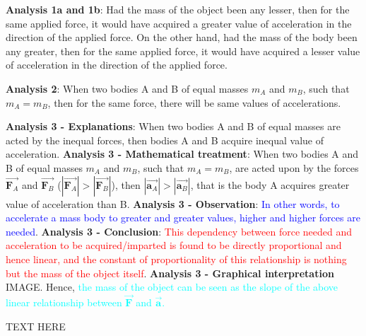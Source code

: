 \begin{flushright}
\begin{minipage}[h]{10.5cm}
\small{
\textbf{Analysis 1a and 1b}: Had the mass of the object been any lesser, then for the same applied force, it would have acquired a greater value of acceleration in the direction of the applied force. On the other hand, had the mass of the body been any greater, then for the same applied force, it would have acquired a lesser value of acceleration in the direction of the applied force.

\textbf{Analysis 2}: When two bodies A and B of equal masses $m_A$ and $m_B$, such that $m_A = m_B$, then for the same force, there will be same values of accelerations.

\textbf{Analysis 3 - Explanations}: When two bodies A and B of equal masses are acted by the inequal forces, then bodies A and B acquire inequal value of acceleration. \textbf{Analysis 3 - Mathematical treatment}: When two bodies A and B of equal masses $m_A$ and $m_B$, such that $m_A = m_B$, are acted upon by the forces $\vec{\mathbf{F}_A}$ and $\vec{\mathbf{F}_B}$ ($|\vec{\mathbf{F}_A}|>|\vec{\mathbf{F}_B}|$), then $|\vec{\mathbf{a}_A}|>|\vec{\mathbf{a}_B}|$, that is the body A acquires greater value of acceleration than B. \textbf{Analysis 3 - Observation}: \textcolor{blue}{In other words, to accelerate a mass body to greater and greater values, higher and higher forces are needed}. \textbf{Analysis 3 - Conclusion}: \textcolor{red}{This dependency between force needed and acceleration to be acquired/imparted is found to be directly proportional and hence linear, and the constant of proportionality of this relationship is nothing but the mass of the object itself}. \textbf{Analysis 3 - Graphical interpretation} IMAGE. Hence, \textcolor{cyan}{the mass of the object can be seen as the slope of the above linear relationship between $\vec{\mathbf{F}}$ and $\vec{\mathbf{a}}$.}
}
\end{minipage}
\end{flushright}
TEXT HERE 

